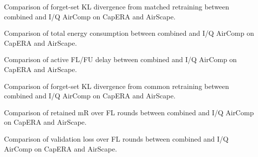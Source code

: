 \caption{Comparison of forget-set KL divergence from matched retraining between combined and I/Q AirComp on CapERA and AirScape.}

\caption{Comparison of total energy consumption between combined and I/Q AirComp on CapERA and AirScape.}

\caption{Comparison of active FL/FU delay between combined and I/Q AirComp on CapERA and AirScape.}

\caption{Comparison of forget-set KL divergence from common retraining between combined and I/Q AirComp on CapERA and AirScape.}

\caption{Comparison of retained mR over FL rounds between combined and I/Q AirComp on CapERA and AirScape.}

\caption{Comparison of validation loss over FL rounds between combined and I/Q AirComp on CapERA and AirScape.}
